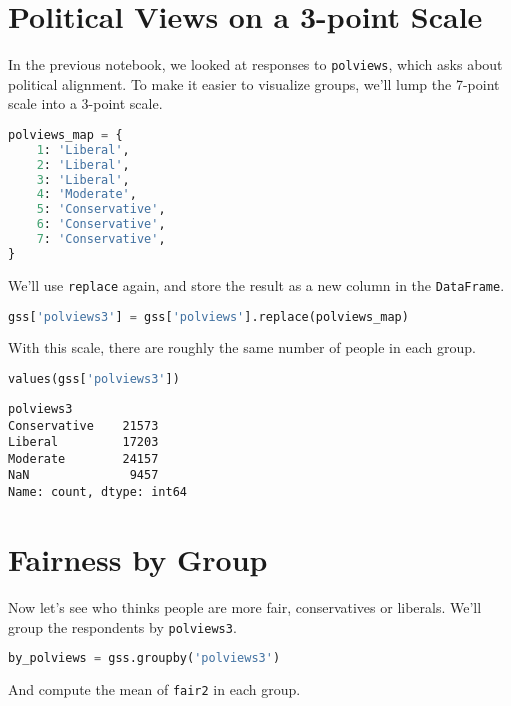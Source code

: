 \section{Political Views on a 3-point
Scale}\label{political-views-on-a-3-point-scale}

In the previous notebook, we looked at responses to
\passthrough{\lstinline!polviews!}, which asks about political
alignment. To make it easier to visualize groups, we'll lump the 7-point
scale into a 3-point scale.

\begin{lstlisting}[language=Python,style=source]
polviews_map = {
    1: 'Liberal',
    2: 'Liberal',
    3: 'Liberal',
    4: 'Moderate',
    5: 'Conservative',
    6: 'Conservative',
    7: 'Conservative',
}
\end{lstlisting}

We'll use \passthrough{\lstinline!replace!} again, and store the result
as a new column in the \passthrough{\lstinline!DataFrame!}.

\begin{lstlisting}[language=Python,style=source]
gss['polviews3'] = gss['polviews'].replace(polviews_map)
\end{lstlisting}

With this scale, there are roughly the same number of people in each
group.

\begin{lstlisting}[language=Python,style=source]
values(gss['polviews3'])
\end{lstlisting}

\begin{lstlisting}[style=output]
polviews3
Conservative    21573
Liberal         17203
Moderate        24157
NaN              9457
Name: count, dtype: int64
\end{lstlisting}

\section{Fairness by Group}\label{fairness-by-group}

Now let's see who thinks people are more fair, conservatives or
liberals. We'll group the respondents by
\passthrough{\lstinline!polviews3!}.

\begin{lstlisting}[language=Python,style=source]
by_polviews = gss.groupby('polviews3')
\end{lstlisting}

And compute the mean of \passthrough{\lstinline!fair2!} in each group.

